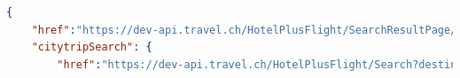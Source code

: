 \begin{lstlisting}[language=json,firstnumber=1]
{
    "href":"https://dev-api.travel.ch/HotelPlusFlight/SearchResultPage/19E2B6BB-1F06-4396-B86E-169EDB368B0E?sortMethod.type=https%3A%2F%2Fdev-api.travel.ch%2FSortType%2FPrice&ratings.minimal=0&ratings.maximal=100&hotelCategories%5B0%5D=https%3A%2F%2Fdev-api.travel.ch%2FHotelCategory%2FNone&hotelCategories%5B1%5D=https%3A%2F%2Fdev-api.travel.ch%2FHotelCategory%2FOne&hotelCategories%5B2%5D=https%3A%2F%2Fdev-api.travel.ch%2FHotelCategory%2FTwo&hotelCategories%5B3%5D=https%3A%2F%2Fdev-api.travel.ch%2FHotelCategory%2FThree&hotelCategories%5B4%5D=https%3A%2F%2Fdev-api.travel.ch%2FHotelCategory%2FFour&hotelCategories%5B5%5D=https%3A%2F%2Fdev-api.travel.ch%2FHotelCategory%2FFive&mealTypeCategories%5B0%5D=https%3A%2F%2Fdev-api.travel.ch%2FHotelMealTypeCategory%2FRoomOnly&mealTypeCategories%5B1%5D=https%3A%2F%2Fdev-api.travel.ch%2FHotelMealTypeCategory%2FBreakfast&mealTypeCategories%5B2%5D=https%3A%2F%2Fdev-api.travel.ch%2FHotelMealTypeCategory%2FHalfBoard&mealTypeCategories%5B3%5D=https%3A%2F%2Fdev-api.travel.ch%2FHotelMealTypeCategory%2FFullBoard&mealTypeCategories%5B4%5D=https%3A%2F%2Fdev-api.travel.ch%2FHotelMealTypeCategory%2FAllInclusive&luggageOptions%5B0%5D=https%3A%2F%2Fdev-api.travel.ch%2FLuggageOption%2FWithLuggage&luggageOptions%5B1%5D=https%3A%2F%2Fdev-api.travel.ch%2FLuggageOption%2FWithoutLuggage",
    "citytripSearch": {
        "href":"https://dev-api.travel.ch/HotelPlusFlight/Search?destination=https%3A%2F%2Fdev-api.travel.ch%2FDestination%2F6547539&periodOfStay.checkInDate=2016-10-05&periodOfStay.checkOutDate=2016-10-08&roomOccupancies%5B0%5D.dateOfBirths%5B0%5D=null&roomOccupancies%5B0%5D.dateOfBirths%5B1%5D=null&hotelCategories%5B0%5D=https%3A%2F%2Fdev-api.travel.ch%2FHotelCategory%2FNone&hotelCategories%5B1%5D=https%3A%2F%2Fdev-api.travel.ch%2FHotelCategory%2FOne&hotelCategories%5B2%5D=https%3A%2F%2Fdev-api.travel.ch%2FHotelCategory%2FTwo&hotelCategories%5B3%5D=https%3A%2F%2Fdev-api.travel.ch%2FHotelCategory%2FThree&hotelCategories%5B4%5D=https%3A%2F%2Fdev-api.travel.ch%2FHotelCategory%2FFour&hotelCategories%5B5%5D=https%3A%2F%2Fdev-api.travel.ch%2FHotelCategory%2FFive&departureAirports%5B0%5D=https%3A%2F%2Fdev-api.travel.ch%2FDestination%2FA6299722&luggageOptions%5B0%5D=https%3A%2F%2Fdev-api.travel.ch%2FLuggageOption%2FWithLuggage&luggageOptions%5B1%5D=https%3A%2F%2Fdev-api.travel.ch%2FLuggageOption%2FWithoutLuggage&ratings.minimal=0&ratings.maximal=100&mealTypeCategories%5B0%5D=https%3A%2F%2Fdev-api.travel.ch%2FHotelMealTypeCategory%2FRoomOnly&mealTypeCategories%5B1%5D=https%3A%2F%2Fdev-api.travel.ch%2FHotelMealTypeCategory%2FBreakfast&mealTypeCategories%5B2%5D=https%3A%2F%2Fdev-api.travel.ch%2FHotelMealTypeCategory%2FHalfBoard&mealTypeCategories%5B3%5D=https%3A%2F%2Fdev-api.travel.ch%2FHotelMealTypeCategory%2FFullBoard&mealTypeCategories%5B4%5D=https%3A%2F%2Fdev-api.travel.ch%2FHotelMealTypeCategory%2FAllInclusive&directFlight=False&flightClasses%5B0%5D=https%3A%2F%2Fdev-api.travel.ch%2FFlightClass%2FEconomy&flightClasses%5B1%5D=https%3A%2F%2Fdev-api.travel.ch%2FFlightClass%2FBusiness&matchHotels=True"

\end{lstlisting}
